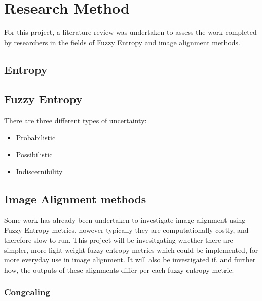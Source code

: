 \section{Research Method}



For this project, a literature review was undertaken to assess the work completed by researchers in the fields of Fuzzy Entropy and image alignment methods.

\subsection{Entropy}

\subsection{Fuzzy Entropy}

There are three different types of uncertainty:
\begin{itemize}
  \item Probabilistic
  \item Possibilistic
  \item Indiscernibility
\end{itemize}

\subsection{Image Alignment methods}

Some work has already been undertaken to investigate image alignment using Fuzzy Entropy metrics, however typically they are computationally costly, and therefore slow to run. This project will be invesitgating whether there are simpler, more light-weight fuzzy entropy metrics which could be implemented, for more everyday use in image alignment. It will also be investigated if, and further how, the outputs of these alignments differ per each fuzzy entropy metric.

\subsubsection{Congealing}

